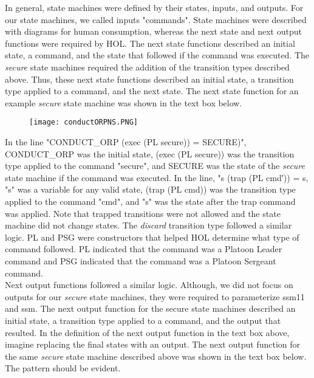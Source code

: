  In general, state machines were defined by their states, inputs, and outputs.
  For our state machines, we called inputs "commands".  State machines were described
  with diagrams for human consumption, whereas the next state and next output functions
  were required by HOL.  The next state functions described an initial state, a command,
  and the state that followed if the command was executed.  The \textit{secure} state
  machines required the addition of the transition types described above.  Thus, these
  next state functions described an initial state, a transition type applied to a command,
  and the next state.  The next state function for an example \textit{secure} state machine
  was shown in the text box below.\\
  
  \begin{figure}[h]
  \centering
  \texttt{[image: conductORPNS.PNG]}
\end{figure}

 In the line "CONDUCT_ORP (exec (PL secure)) = SECURE)", CONDUCT_ORP was the initial state,
  (exec (PL secure)) was the transition type applied to the command "secure", and SECURE was the
  state of the \textit{secure} state machine if the command was executed.  In the line,
  "s (trap (PL cmd′)) = s, "s" was a variable for any valid state, (trap (PL cmd)) was the
  transition type applied to the command "cmd", and "s" was the state after the trap command
  was applied.  Note that trapped transitions were not allowed and the state machine did not
  change states.  The \textit{discard} transition type followed a similar logic.  PL and PSG
  were constructors that helped HOL determine what type of command followed. PL indicated that
  the command was a Platoon Leader command and PSG indicated that the command was a Platoon Sergeant command.\\
  
 Next output functions followed a similar logic.  Although, we did not focus on
  outputs for our \textit{secure} state machines, they were required to parameterize ssm11
  and ssm.  The next output function for the secure state machines described an initial state,
  a transition type applied to a command, and the output that resulted.  In the definition of
  the next output function in the text box above, imagine replacing the final states with an
  output.    The next output function for the same \textit{secure} state machine described
  above was shown in the text box below.   The pattern should be evident.\\
  
